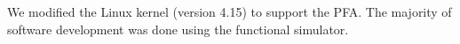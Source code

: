 We modified the Linux kernel (version 4.15\cite{linux}) to support the PFA. The
majority of software development was done using the functional simulator.

%
%
